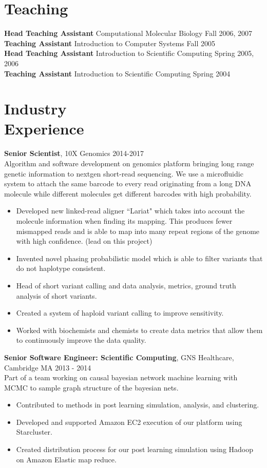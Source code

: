 \documentclass[10pt]{res}
\begin{document}
\begin{resume}
\section{Teaching}
{\bf Head Teaching Assistant} Computational Molecular Biology \hfill Fall 2006, 2007 \\
{\bf Teaching Assistant} Introduction to Computer Systems \hfill Fall 2005 \\ 
{\bf Head Teaching Assistant} Introduction to Scientific Computing \hfill Spring 2005, 2006 \\
{\bf Teaching Assistant} Introduction to Scientific Computing \hfill  Spring 2004 \\

\section{Industry \\Experience}

{\bf Senior Scientist}, 10X Genomics \hfill 2014-2017 \\
Algorithm and software development on genomics platform bringing long range genetic information to nextgen short-read sequencing. We use a microfluidic system to attach the same barcode to every read originating from a long DNA molecule while different molecules get different barcodes with high probability. 
\begin{itemize}
\item Developed new linked-read aligner ``Lariat" which takes into account the molecule information when finding its mapping. This produces fewer mismapped reads and is able to map into many repeat regions of the genome with high confidence. (lead on this project)
\item Invented novel phasing probabilistic model which is able to filter variants that do not haplotype consistent. 
\item Head of short variant calling and data analysis, metrics, ground truth analysis of short variants.
\item Created a system of haploid variant calling to improve sensitivity. 
\item Worked with biochemists and chemists to create data metrics that allow them to continuously improve the data quality.
\end{itemize}


{\bf Senior Software Engineer: Scientific Computing}, GNS Healthcare, Cambridge MA \hfill 2013 - 2014 \\
Part of a team working on causal bayesian network machine learning with MCMC to sample graph structure of the bayesian nets. \\
\begin{itemize}
\item Contributed to methods in post learning simulation, analysis, and clustering.
\item Developed and supported Amazon EC2 execution of our platform using Starcluster.
\item Created distribution process for our post learning simulation using Hadoop on Amazon Elastic map reduce. 
\end{itemize}



\end{resume}
\end{document}
